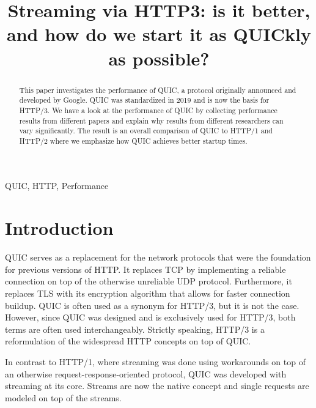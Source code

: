 \documentclass[conference]{IEEEtran}
\begin{document}
\title{Streaming via HTTP3: is it better, and how do we start it as QUICkly as possible?}

\author{
}

\maketitle

\begin{abstract}
This paper investigates the performance of QUIC, a protocol originally announced and developed by Google. QUIC was standardized in 2019 and is now the basis for HTTP/3. We have a look at the performance of QUIC by collecting performance results from different papers and explain why results from different researchers can vary significantly. The result is an overall comparison of QUIC to HTTP/1 and HTTP/2 where we emphasize how QUIC achieves better startup times.
\end{abstract}

\begin{IEEEkeywords}
QUIC, HTTP, Performance
\end{IEEEkeywords}

\section{Introduction}

QUIC serves as a replacement for the network protocols that were the foundation for previous versions of HTTP. It replaces TCP by implementing a reliable connection on top of the otherwise unreliable UDP protocol. Furthermore, it replaces TLS with its encryption algorithm that allows for faster connection buildup. QUIC is often used as a synonym for HTTP/3, but it is not the case. However, since QUIC was designed and is exclusively used for HTTP/3, both terms are often used interchangeably. Strictly speaking, HTTP/3 is a reformulation of the widespread HTTP concepts on top of QUIC.

In contrast to HTTP/1, where streaming was done using workarounds on top of an otherwise request-response-oriented protocol, QUIC was developed with streaming at its core. Streams are now the native concept and single requests are modeled on top of the streams.
\end{document}
